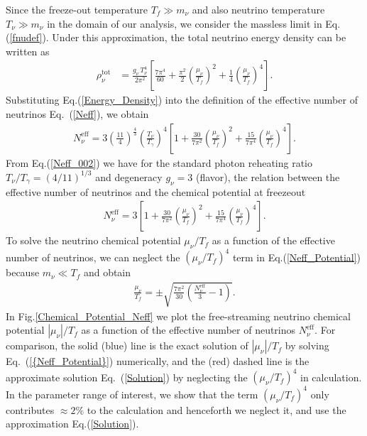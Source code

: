 Since the freeze-out temperature $T_f\gg m_\nu$ and also neutrino temperature $T_\nu\gg m_\nu$ in the domain of our analysis, we consider the massless limit in Eq.\;(\ref{fnudef}). Under this approximation, the total neutrino energy density can be written as
\begin{align}
\label{Energy_Density}
\rho_\nu^{\mathrm{tot}}
&=\frac{g_\nu\,T_\nu^4}{2\pi^2}\left[\frac{7\pi^4}{60}+\frac{\pi^2}{2}\left(\frac{\mu_\nu}{T_f}\right)^{\!\!2}+\frac{1}{4}\left(\frac{\mu_\nu}{T_f}\right)^{\!\!4}\right].
\end{align}
Substituting Eq.\;(\ref{Energy_Density}) into the definition of the effective number of neutrinos Eq.~(\ref{Neff}), we obtain 
\begin{align}
\label{Neff_002}
N_\nu^{\mathrm{eff}}\!\!
=\!3\!\left(\frac{11}{4}\right)^{\!\!\frac{4}{3}}\!\!\left(\frac{T_\nu}{T_\gamma}\right)^{\!\!4}\!
\left[1\!+\!\frac{30}{7\pi^2}\!\!\left(\frac{\mu_\nu}{T_f}\right)^{\!\!2} 
\!\!+\frac{15}{7\pi^4}\!\!\left(\frac{\mu_\nu}{T_f}\right)^{\!\!4}\right].
\end{align}
From Eq.\;(\ref{Neff_002}) we have for the standard photon reheating ratio $T_\nu/T_\gamma=(4/11)^{1/3}$ \cite{Kolb:1990vq} and degeneracy $g_\nu=3$ (flavor), the relation between the effective number of neutrinos and the chemical potential at freezeout
\begin{align}
\label{Neff_Potential}
N_\nu^{\mathrm{eff}}=3\left[1+\frac{30}{7\pi^2}\left(\frac{\mu_\nu}{T_f}\right)^{\!\!2}+ \frac{15}{7\pi^4} \left(\frac{\mu_\nu}{T_f}\right)^{\!\!4}\right].
\end{align}
To solve the neutrino chemical potential $\mu_\nu/T_f$ as a function of the effective number of neutrinos, we can neglect the $(\mu_\nu/T_f)^4$ term in Eq.\;(\ref{Neff_Potential}) because $m_\nu\ll T_f$ and obtain
\begin{align}\label{Solution}
\frac{\mu_\nu}{T_f}=\pm\sqrt{\frac{7\pi^2}{30}\left(\frac{N_\nu^{\mathrm{eff}}}{3}-1\right)}.
\end{align}
In Fig.\;\ref{Chemical_Potential_Neff} we plot the free-streaming neutrino chemical potential $|\mu_\nu|/T_f$ as a function of the effective number of neutrinos $N_\nu^{\mathrm{eff}}$. For comparison, the solid (blue) line is the exact solution of $|\mu_\nu|/T_f$ by solving Eq.~(\ref{{Neff_Potential}}) numerically, and the (red) dashed line is the approximate solution Eq.~(\ref{Solution}) by neglecting the $(\mu_\nu/T_f)^4$ in calculation. In the parameter range of interest, we show that the term $(\mu_\nu/T_f)^4$ only contributes $\approx 2\%$ to the calculation and henceforth we neglect it, and use the approximation Eq.\;(\ref{Solution}). 

